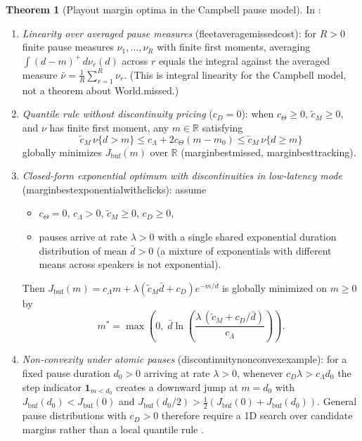 \documentclass[11pt,a4paper]{article}
\DeclareRobustCommand{\lean}[1]{{\ttfamily\def\_{\textunderscore\allowbreak}#1}}
\newcommand{\R}{\mathbb{R}}
\theoremstyle{definition}
\newtheorem{theorem}[definition]{Theorem}
\begin{document}
\begin{theorem}[Playout margin optima in the Campbell pause model]
\label{thm:level}
In :
\begin{enumerate}
\item \emph{Linearity over averaged pause measures}
  (\lean{fleet\_average\_missed\_cost}): for $R > 0$ finite pause measures
  $\nu_1, \dots, \nu_R$ with finite first moments, averaging
  $\int (d - m)^+\,d\nu_r(d)$ across $r$ equals the integral against the
  averaged measure $\bar\nu = \frac{1}{R}\sum_{r=1}^R \nu_r$. (This is integral
  linearity for the Campbell model, not a theorem about \lean{World.missed}.)
\item \emph{Quantile rule without discontinuity pricing} ($c_D = 0$):
  when $c_\Theta \ge 0$, $\tilde c_M \ge 0$, and $\nu$ has finite first moment,
  any $m \in \R$ satisfying
  \[
    \tilde c_M\,\nu\{d > m\} \le c_\Lambda + 2 c_\Theta (m - m_0)
    \le \tilde c_M\,\nu\{d \ge m\}
  \]
  globally minimizes $J_{\mathrm{buf}}(m)$ over $\R$ (\lean{margin\_best\_missed},
  \lean{margin\_best\_tracking}).
\item \emph{Closed-form exponential optimum with discontinuities in low-latency
  mode} (\lean{margin\_best\_exponential\_with\_clicks}): assume
  \begin{itemize}
  \item $c_\Theta = 0$, $c_\Lambda > 0$, $\tilde c_M \ge 0$, $c_D \ge 0$,
  \item pauses arrive at rate $\lambda > 0$ with a single shared exponential
    duration distribution of mean $\bar d > 0$ (a mixture of exponentials with
    different means across speakers is not exponential).
  \end{itemize}
  Then $J_{\mathrm{buf}}(m) = c_\Lambda m + \lambda(\tilde c_M \bar d + c_D) e^{-m / \bar d}$
  is globally minimized on $m \ge 0$ by
  \[
    m^* = \max\!\left(0,\;
      \bar d \ln\!\left(\frac{\lambda\,(\tilde c_M + c_D / \bar d)}{c_\Lambda}\right)\right) .
  \]
\item \emph{Non-convexity under atomic pauses}
  (\lean{discontinuity\_nonconvex\_example}): for a fixed pause duration
  $d_0 > 0$ arriving at rate $\lambda > 0$, whenever $c_D \lambda > c_\Lambda d_0$
  the step indicator $\mathbf{1}_{m < d_0}$ creates a downward jump at $m = d_0$
  with $J_{\mathrm{buf}}(d_0) < J_{\mathrm{buf}}(0)$ and
  $J_{\mathrm{buf}}(d_0/2) > \frac{1}{2}(J_{\mathrm{buf}}(0) + J_{\mathrm{buf}}(d_0))$.
  General pause distributions with $c_D > 0$ therefore require a 1D search over
  candidate margins rather than a local quantile rule \cite{unisono-spec}.
\end{enumerate}
\end{theorem}
\end{document}
